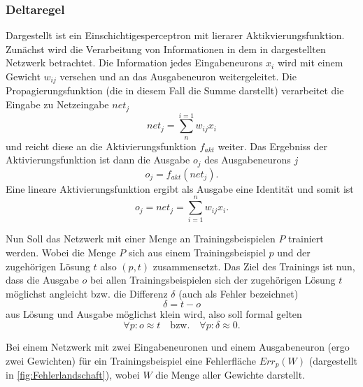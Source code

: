 \subsubsection{Deltaregel}\label{sec:deltaregel}


Dargestellt ist ein Einschichtigesperceptron mit lierarer Aktikvierungsfunktion.
Zunächst wird die Verarbeitung von Informationen in dem in  dargestellten Netzwerk betrachtet. Die Information jedes Eingabeneurons $x_i$ wird mit einem Gewicht $w_{ij}$ versehen und an das Ausgabeneuron weitergeleitet. Die Propagierungsfunktion (die in diesem Fall die Summe darstellt) verarbeitet die Eingabe zu Netzeingabe $net_j$
\begin{equation}
net_j= \sum^{i=1}_n w_{ij} x_i
\end{equation}
und reicht diese an die Aktivierungsfunktion $f_{akt}$ weiter. Das Ergebniss der Aktivierungsfunktion ist dann die Ausgabe $o_j$ des Ausgabeneurons $j$
\begin{equation}
o_j= f_{akt}(net_j).
\end{equation}
Eine lineare Aktivierungsfunktion ergibt als Ausgabe eine Identität und somit ist
\begin{equation}
o_j= net_j= \sum_{i=1}^n w_{ij} x_i.
\label{gl:ausgang}
\end{equation}

Nun Soll das Netzwerk mit einer Menge an Trainingsbeispielen $P$ trainiert werden. Wobei die Menge $P$ sich aus einem Trainingsbeispiel $p$ und der zugehörigen Lösung $t$ also $(p,t)$ zusammensetzt.
Das Ziel des Trainings ist nun, dass die Ausgabe $o$ bei allen Trainingsbeispielen sich der zugehörigen Lösung $t$ möglichst angleicht bzw. die Differenz $\delta$ (auch als Fehler bezeichnet) 
\begin{equation}
\delta=t-o
\label{gl:delta}
\end{equation}
%
aus Lösung und Ausgabe möglichst klein  wird, also soll formal gelten
\begin{equation*}
\forall p:o \approx t \quad \text{bzw.} \quad \forall p:\delta \approx 0.
\end{equation*}

Bei einem Netzwerk mit zwei Eingabeneuronen und einem Ausgabeneuron (ergo zwei Gewichten) für ein Trainingsbeispiel eine Fehlerfläche $Err_p(W)$ (dargestellt in \autoref{fig:Fehlerlandschaft}), wobei $W$ die Menge aller Gewichte darstellt.

